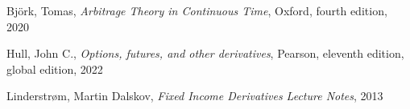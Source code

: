 \clearpage
{}

\begin{thebibliography}{25}
Björk, Tomas,
\emph{Arbitrage Theory in Continuous Time},
 Oxford, fourth edition, 2020

Hull, John C., 
\emph{Options, futures, and other derivatives},
Pearson, eleventh edition, global edition, 2022

Linderstrøm, Martin Dalskov, 
\emph{Fixed Income Derivatives Lecture Notes},
2013
 
\end{thebibliography}

